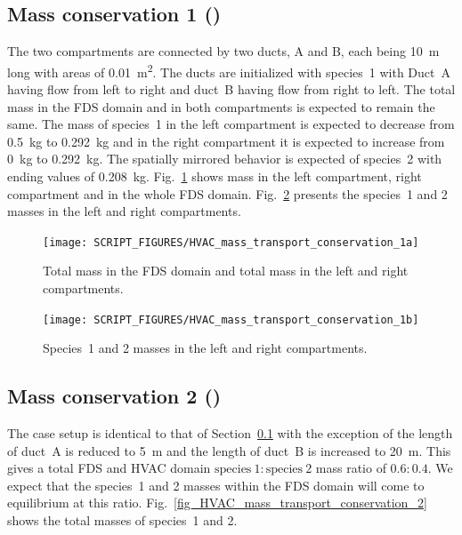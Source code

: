 \documentclass[11pt]{book}
\begin{document}
\subsection{Mass conservation 1 (\texorpdfstring{}{HVAC\_mass\_transport\_conservation\_1})}
\label{HVAC_mass_transport_conservation_1}
The two compartments are connected by two ducts, A and B, each being \SI{10}{\meter} long with areas of \SI{0.01}{\meter\squared}. The ducts are initialized with species~1 with Duct~A having flow from left to right and duct~B having flow from right to left. The total mass in the FDS domain and in both compartments is expected to remain the same. The mass of species~1 in the left compartment is expected to decrease from \SI{0.5}{\kilogram} to \SI{0.292}{\kilogram} and in the right compartment it is expected to increase from \SI{0}{\kilogram} to \SI{0.292}{\kilogram}. The spatially mirrored behavior is expected of species~2 with ending values of \SI{0.208}{\kilogram}. Fig.~\ref{fig_HVAC_mass_transport_conservation_1a} shows mass in the left compartment, right compartment and in the whole FDS domain. Fig.~\ref{fig_HVAC_mass_transport_conservation_1b} presents the species~1 and 2 masses in the left and right compartments.

\begin{figure}[ht]
\centering
\texttt{[image: SCRIPT\_FIGURES/HVAC\_mass\_transport\_conservation\_1a]}
\caption[ test case]{Total mass in the FDS domain and total mass in the left and right compartments.}
\label{fig_HVAC_mass_transport_conservation_1a}
\end{figure}

\begin{figure}[ht]
\centering
\texttt{[image: SCRIPT\_FIGURES/HVAC\_mass\_transport\_conservation\_1b]}
\caption[ test case]{Species~1 and 2 masses in the left and right compartments.}
\label{fig_HVAC_mass_transport_conservation_1b}
\end{figure}

\subsection{Mass conservation 2 (\texorpdfstring{}{HVAC\_mass\_transport\_conservation\_2})}
\label{HVAC_mass_transport_conservation_2}
The case setup is identical to that of Section~\ref{HVAC_mass_transport_conservation_1} with the exception of the length of duct~A is reduced to \SI{5}{\meter} and the length of duct~B is increased to \SI{20}{\meter}. This gives a total FDS and HVAC domain \(\text{species}\ 1 \colon \text{species}\ 2\) mass ratio of \(0.6 \colon 0.4\). We expect that the species~1 and 2 masses within the FDS domain will come to equilibrium at this ratio. Fig.~\ref{fig_HVAC_mass_transport_conservation_2} shows the total masses of species~1 and 2.
\end{document}
